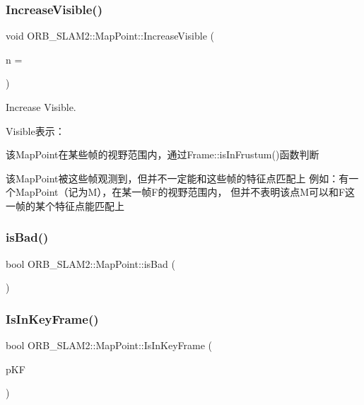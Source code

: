 \subsubsection{\texorpdfstring{Increase\+Visible()}{IncreaseVisible()}}
{\footnotesize\ttfamily void O\+R\+B\+\_\+\+S\+L\+A\+M2\+::\+Map\+Point\+::\+Increase\+Visible (\begin{DoxyParamCaption}\item[{int}]{n = {} }\end{DoxyParamCaption})}



Increase Visible. 

Visible表示：
\begin{DoxyEnumerate}
\item 该\+Map\+Point在某些帧的视野范围内，通过\+Frame\+::is\+In\+Frustum()函数判断
\item 该\+Map\+Point被这些帧观测到，但并不一定能和这些帧的特征点匹配上 例如：有一个\+Map\+Point（记为\+M），在某一帧\+F的视野范围内， 但并不表明该点\+M可以和\+F这一帧的某个特征点能匹配上 
\end{DoxyEnumerate}\mbox{\label{class_o_r_b___s_l_a_m2_1_1_map_point_a46bb6b57cd914c9ebad30007f3af469a}} 
\subsubsection{\texorpdfstring{is\+Bad()}{isBad()}}
{\footnotesize\ttfamily bool O\+R\+B\+\_\+\+S\+L\+A\+M2\+::\+Map\+Point\+::is\+Bad (\begin{DoxyParamCaption}{ }\end{DoxyParamCaption})}

\mbox{\label{class_o_r_b___s_l_a_m2_1_1_map_point_a7a8c48a885598ba4da3b188791dfd009}} 
\subsubsection{\texorpdfstring{Is\+In\+Key\+Frame()}{IsInKeyFrame()}}
{\footnotesize\ttfamily bool O\+R\+B\+\_\+\+S\+L\+A\+M2\+::\+Map\+Point\+::\+Is\+In\+Key\+Frame (\begin{DoxyParamCaption}\item[{\mbox{\hyperlink{class_o_r_b___s_l_a_m2_1_1_key_frame}{Key\+Frame}} $\ast$}]{p\+KF }\end{DoxyParamCaption})}




